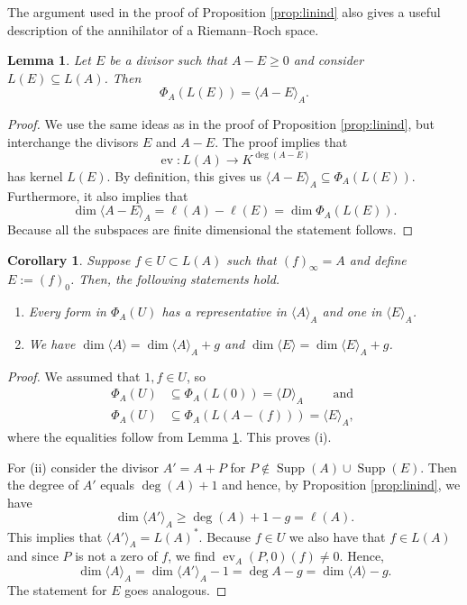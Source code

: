 \documentclass[12pt]{amsart}
\renewcommand{\geq}{\geqslant}
\DeclareMathOperator{\ev}{ev}
\DeclareMathOperator{\Supp}{Supp}
\newtheorem{lemma}[theorem]{Lemma}
\newtheorem{corollary}[theorem]{Corollary}
\theoremstyle{definition}
\newcommand{\divi}[1]{\langle #1 \rangle}
\begin{document}
	The argument used in the proof of Proposition \ref{prop:linind} also gives a useful description of the annihilator of a Riemann--Roch space.
	\begin{lemma}\label{lem:rranh}
		Let $E$ be a divisor such that $A - E \geq 0$ and consider $L(E) \subseteq L(A)$. Then 
		$$\Phi_{A}(L(E)) = \langle A - E \rangle_A. $$ 
	\end{lemma}
	\begin{proof}
		We use the same ideas as in the proof of Proposition \ref{prop:linind}, but interchange the divisors $E$ and $A - E$. The proof implies that 
		$$\ev : L(A) \rightarrow K^{\deg(A-E)}$$ has kernel $L(E)$. By definition, this gives us $\langle A - E \rangle_A \subseteq \Phi_A(L(E))$. Furthermore, it also implies that 
		$$\dim \langle A - E \rangle_A = \ell(A) - \ell(E) = \dim \Phi_A(L(E)).$$
		Because all the subspaces are finite dimensional the statement follows.
	\end{proof}
		
	\begin{corollary}\label{cor:representative}
		Suppose $f \in U \subset L(A)$ such that $(f)_\infty = A$ and define $E := (f)_0$. Then, the following statements hold.
		\begin{enumerate}[\normalfont (i)]
			\item Every form in $\Phi_A(U)$ has a representative in $\divi {A}_A$ and one in $\divi {E}_{A}$.
			\item We have $\dim \divi A = \dim \divi A_A + g$ and $\dim \divi E = \dim \divi E_A + g$. 
		\end{enumerate}
	\end{corollary}
	\begin{proof}
		We assumed that $1, f \in U$, so
		\begin{align*}
			\Phi_{A}(U) &\subseteq \Phi_A(L(0)) = \langle D \rangle_A \qquad \text{ and } \\
			\Phi_{A}(U) &\subseteq \Phi_A(L(A-(f))) = \langle E \rangle_A,
		\end{align*}
		where the equalities follow from Lemma \ref{lem:rranh}. This proves (i). 
		
		For (ii) consider the divisor $A' = A + P$ for $P \not\in \Supp(A)\cup\Supp(E)$. Then the degree of $A'$ equals $\deg(A) + 1$ and hence, by Proposition \ref{prop:linind}, we have 
		$$\dim \divi {A'}_A \geq \deg(A) + 1 - g = \ell(A).$$ 
		This implies that $\divi {A'}_A = L(A)^\ast$. Because $f \in U$ we also have that $f \in L(A)$ and since $P$ is not a zero of $f$, we find $\ev_A(P, 0)(f) \neq 0$. Hence,
		$$\dim \divi A_A = \dim \divi {A'}_A  - 1= \deg A - g = \dim \divi A - g.$$ The statement for $E$ goes analogous. 
	\end{proof}
	
\end{document}
